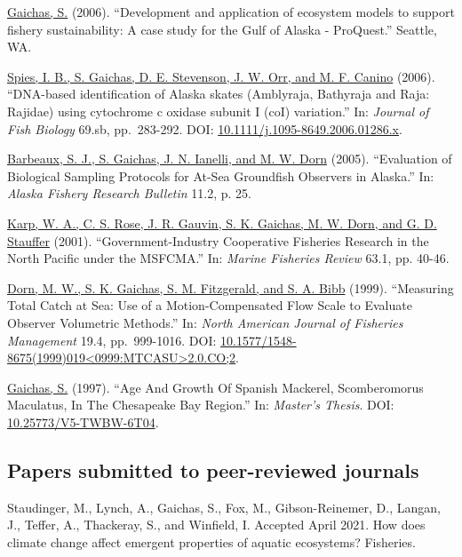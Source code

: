 \documentclass[11pt, a4paper]{awesome-cv}
\begin{document}
\protect\hyperlink{cite-gaichas_development_2006}{Gaichas, S.} (2006).
``Development and application of ecosystem models to support fishery
sustainability: A case study for the Gulf of Alaska - ProQuest.''
Seattle, WA.

\protect\hyperlink{cite-spies_dna-based_2006}{Spies, I. B., S. Gaichas,
D. E. Stevenson, J. W. Orr, and M. F. Canino} (2006). ``DNA-based
identification of Alaska skates (Amblyraja, Bathyraja and Raja: Rajidae)
using cytochrome c oxidase subunit I (coI) variation.'' In:
\emph{Journal of Fish Biology} 69.sb, pp.~283-292. DOI:
\href{https://doi.org/10.1111\%2Fj.1095-8649.2006.01286.x}{10.1111/j.1095-8649.2006.01286.x}.

\protect\hyperlink{cite-barbeaux_evaluation_2005}{Barbeaux, S. J., S.
Gaichas, J. N. Ianelli, and M. W. Dorn} (2005). ``Evaluation of
Biological Sampling Protocols for At-Sea Groundfish Observers in
Alaska.'' In: \emph{Alaska Fishery Research Bulletin} 11.2, p. 25.

\protect\hyperlink{cite-karp_government-industry_2001}{Karp, W. A., C.
S. Rose, J. R. Gauvin, S. K. Gaichas, M. W. Dorn, and G. D. Stauffer}
(2001). ``Government-Industry Cooperative Fisheries Research in the
North Pacific under the MSFCMA.'' In: \emph{Marine Fisheries Review}
63.1, pp. 40-46.

\protect\hyperlink{cite-dorn_measuring_1999}{Dorn, M. W., S. K. Gaichas,
S. M. Fitzgerald, and S. A. Bibb} (1999). ``Measuring Total Catch at
Sea: Use of a Motion-Compensated Flow Scale to Evaluate Observer
Volumetric Methods.'' In: \emph{North American Journal of Fisheries
Management} 19.4, pp.~999-1016. DOI:
\href{https://doi.org/10.1577\%2F1548-8675\%281999\%29019\%3C0999\%3AMTCASU\%3E2.0.CO\%3B2}{10.1577/1548-8675(1999)019\textless0999:MTCASU\textgreater2.0.CO;2}.

\protect\hyperlink{cite-gaichas_age_1997}{Gaichas, S.} (1997). ``Age And
Growth Of Spanish Mackerel, Scomberomorus Maculatus, In The Chesapeake
Bay Region.'' In: \emph{Master's Thesis}. DOI:
\href{https://doi.org/10.25773\%2FV5-TWBW-6T04}{10.25773/V5-TWBW-6T04}.

\hypertarget{papers-submitted-to-peer-reviewed-journals}{%
\subsection{Papers submitted to peer-reviewed
journals}\label{papers-submitted-to-peer-reviewed-journals}}

Staudinger, M., Lynch, A., Gaichas, S., Fox, M., Gibson-Reinemer, D.,
Langan, J., Teffer, A., Thackeray, S., and Winfield, I. Accepted April
2021. How does climate change affect emergent properties of aquatic
ecosystems? Fisheries.
\end{document}
